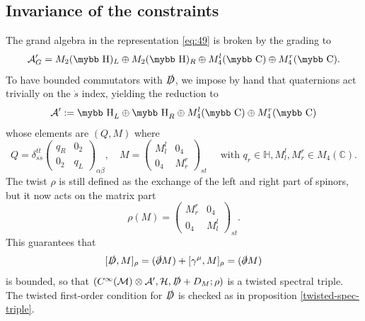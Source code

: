 \documentclass[11pt]{article}
\newcommand{\M}{\mathcal M}
\newcommand{\A}{\mathcal A}
\newcommand{\ds}{\slashed \partial}
\newcommand{\Ds}{\slashed D}
\def\bb#1{\hbox{\mybb#1}}
\begin{document}
\subsection{Invariance of the constraints}
\label{subsec:inv}

The grand algebra in the representation
\eqref{eq:49} is broken by  the grading to \cite[eq. (3.17)]{Devastato:2013fk} 
\begin{equation}
  \label{eq:39}
  \A'_G = M_2(\bb H)_L \oplus M_2(\bb H)_R \oplus M_4^l(\bb C) \oplus M_4^r(\bb C).   
\end{equation}
To have bounded commutators with $\Ds$, we impose by hand that
quaternions act trivially on the $\dot s$ index, yielding the reduction to
\begin{equation}
  \label{eq:45}
\A':= \bb H_L  \oplus \bb H_R  \oplus M_4^l(\bb C) \oplus M_4^r(\bb C)
\end{equation}
whose elements are $(Q, M)$ where 
\begin{equation}
  \label{eq:59}
   Q= \delta_{s\dot s}^{t\dot t} 
   \left(\begin{array}{cc} 
       q_R& 0_2\\
       0_2 &  q_L
     \end{array}\right)_{\alpha\beta}, \quad M = 
   \left(\begin{array}{cc}
       M_l^l & 0_4 \\ 
       0_4 & M_r^r
     \end{array}\right)_{st}
\quad\text{ with }
q_r\in{\mathbb H}, M_l^l, M_r^r \in M_4(\mathbb C).
\end{equation}
The twist $\rho$ is still defined as the exchange of the left and
right part of spinors, but it now acts on the matrix part
\begin{equation}
  \label{eq:61}
  \rho(M) = \left(
    \begin{array}{cc}
      M_r^r & 0_4 \\ 
      0_4 & M_l^l
    \end{array}\right)_{ s t}.
\end{equation}
This guarantees that 
\begin{equation}
  \label{eq:51}
[\Ds, M]_\rho = (\ds M) +[\gamma^\mu, M]_\rho   = (\ds M)
\end{equation}
is bounded, so that $(C^\infty(\M)\otimes \A', {\cal H}, \Ds + D_M; \rho)$ is a twisted
spectral triple. The twisted first-order condition for $\Ds$ is
checked as in proposition \ref{twisted-spec-triple}.
\end{document}
